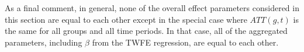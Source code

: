 \documentclass[11pt]{article}%
\theoremstyle{plain}
\numberwithin{sassumption}{section}
\numberwithin{equation}{section}
\begin{document}
As a final comment, in general, none of the overall effect parameters
considered in this section are equal to each other except in the special case
where $ATT(g,t)$ is the same for all groups and all time periods. In that
case, all of the aggregated parameters, including $\beta$ from the TWFE
regression, are equal to each other.





\end{document}
